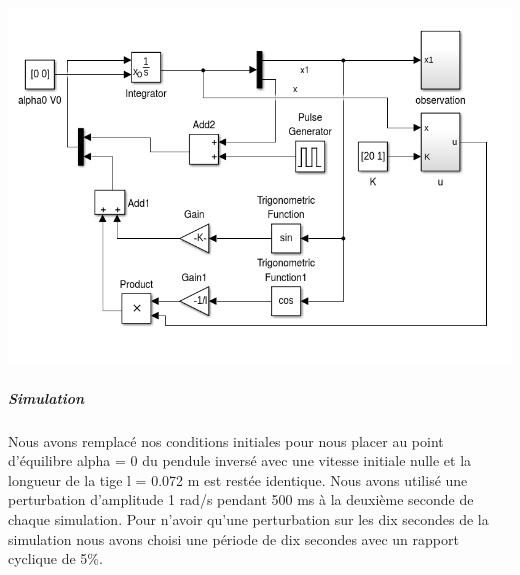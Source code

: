 \documentclass[a4paper,12pt]{article}
\begin{document}
\begin{center}
\includegraphics[width=14cm]{./img/tp2_pi.png}
\end{center}

\subparagraph{Simulation}

Nous avons remplacé nos conditions initiales pour nous placer au point d'équilibre alpha = 0 du pendule inversé avec une vitesse initiale nulle et la longueur de la tige l = 0.072 m est restée identique.
Nous avons utilisé une perturbation d'amplitude 1 rad/s pendant 500 ms à la deuxième seconde de chaque simulation. 
Pour n'avoir qu'une perturbation sur les dix secondes de la simulation nous avons choisi une période de dix secondes avec un rapport cyclique de 5\%.
\end{document}
